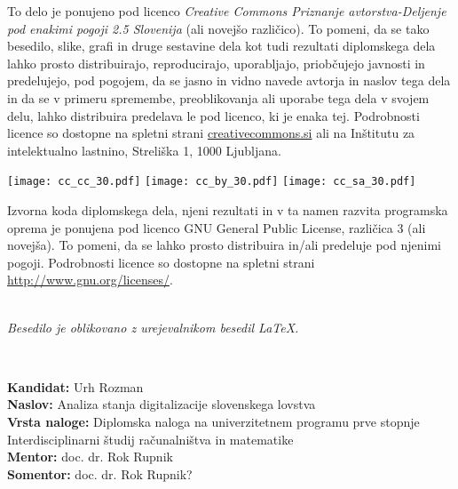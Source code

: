 \documentclass[a4paper,12pt,openright]{book}
\newcommand{\clearemptydoublepage}{\newpage{\pagestyle{empty}\cleardoublepage}}
\newcommand{\CcImageCc}[1]{%
	\texttt{[image: cc\_cc\_30.pdf]}%
}
\newcommand{\CcImageBy}[1]{%
	\texttt{[image: cc\_by\_30.pdf]}%
}
\newcommand{\CcImageSa}[1]{%
	\texttt{[image: cc\_sa\_30.pdf]}%
}
\begin{document}
\newpage
\thispagestyle{empty}

\vspace*{5cm}
{\small \noindent
To delo je ponujeno pod licenco \textit{Creative Commons Priznanje avtorstva-Deljenje pod enakimi pogoji 2.5 Slovenija} (ali novej\v so razli\v cico).
To pomeni, da se tako besedilo, slike, grafi in druge sestavine dela kot tudi rezultati diplomskega dela lahko prosto distribuirajo,
reproducirajo, uporabljajo, priobčujejo javnosti in predelujejo, pod pogojem, da se jasno in vidno navede avtorja in naslov tega
dela in da se v primeru spremembe, preoblikovanja ali uporabe tega dela v svojem delu, lahko distribuira predelava le pod
licenco, ki je enaka tej.
Podrobnosti licence so dostopne na spletni strani \href{http://creativecommons.si}{creativecommons.si} ali na Inštitutu za
intelektualno lastnino, Streliška 1, 1000 Ljubljana.

\vspace*{1cm}
\begin{center}%
\CcImageCc{0.741573033707865}\hspace*{1ex}\CcImageBy{1}\hspace*{1ex}\CcImageSa{1}%
\end{center}
}

\vspace*{1cm}
{\small \noindent
Izvorna koda diplomskega dela, njeni rezultati in v ta namen razvita programska oprema je ponujena pod licenco GNU General Public License,
različica 3 (ali novejša). To pomeni, da se lahko prosto distribuira in/ali predeluje pod njenimi pogoji.
Podrobnosti licence so dostopne na spletni strani \url{http://www.gnu.org/licenses/}.
}

\vfill
\begin{center} 
\ \\ \vfill
{\em
Besedilo je oblikovano z urejevalnikom besedil \LaTeX.}
\end{center}

\clearemptydoublepage

\thispagestyle{empty}
\
\vfill

\bigskip
\noindent\textbf{Kandidat:} Urh Rozman\\
\noindent\textbf{Naslov:} Analiza stanja digitalizacije slovenskega lovstva\\
\noindent\textbf{Vrsta naloge:} Diplomska naloga na univerzitetnem programu prve stopnje Interdisciplinarni študij računalništva in matematike \\
\noindent\textbf{Mentor:} doc. dr. Rok Rupnik\\
\noindent\textbf{Somentor:} doc. dr. Rok Rupnik?
\end{document}
